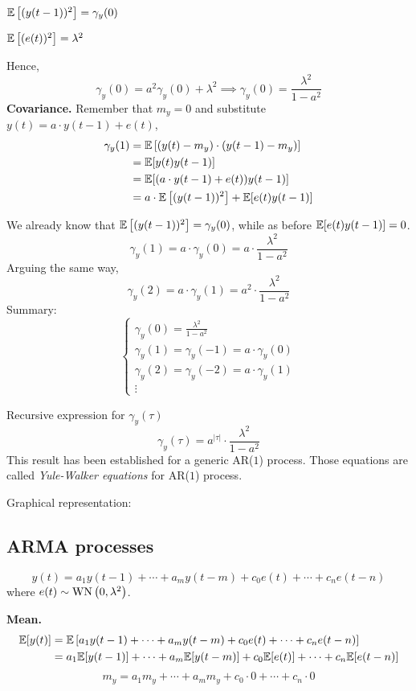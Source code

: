 $\mathbb{E}\left[(y(t-1))^{2}\right]=\gamma_{y}(0)$

$\mathbb{E}\left[(e(t))^{2}\right]=\lambda^{2}$

Hence,
\[
	\gamma_{y}(0)=a^{2} \gamma_{y}(0)+\lambda^{2} \implies \gamma_{y}(0)=\frac{\lambda^{2}}{1-a^{2}}
\]
\textbf{Covariance.}
Remember that $m_{y}=0$ and substitute $y(t)=a \cdot y(t-1)+e(t)$,
\begin{align*}
	\gamma_{y}(1)&=\mathbb{E}\left[\left(y(t)-m_{y}\right) \cdot\left(y(t-1)-m_{y}\right)\right]\\
	&=\mathbb{E}[y(t) y(t-1)]\\
	&=\mathbb{E}[(a \cdot y(t-1)+e(t))y(t-1)]\\
	&=a \cdot \mathbb{E}\left[(y(t-1))^{2}\right]+\mathbb{E}[e(t) y(t-1)]
\end{align*}

We already know that $\mathbb{E}\left[(y(t-1))^{2}\right]=\gamma_{y}(0)$, while as before $\mathbb{E}[e(t) y(t-1)]=0$.
$$
\gamma_{y}(1)=a \cdot \gamma_{y}(0)=a \cdot \frac{\lambda^{2}}{1-a^{2}}
$$
Arguing the same way,
\[
	\gamma_{y}(2)=a \cdot \gamma_{y}(1)=a^{2} \cdot \frac{\lambda^{2}}{1-a^{2}}
\]
Summary:
\begin{equation*}
	\boxed{
		\begin{cases}
			\gamma_{y}(0)=\frac{\lambda^{2}}{1-a^{2}} \\
			\gamma_{y}(1)=\gamma_{y}(-1)=a \cdot \gamma_{y}(0) \\
			\gamma_{y}(2)=\gamma_{y}(-2)=a \cdot \gamma_{y}(1) \\
			\vdots
		\end{cases}
	}
\end{equation*}

Recursive expression for $\gamma_{y}(\tau)$
$$
	\gamma_{y}(\tau)=a^{|\tau|}\cdot \frac{\lambda^{2}}{1-a^{2}}
$$
This result has been established for a generic AR($1$) process.
Those equations are called \emph{Yule-Walker equations} for AR($1$) process.

Graphical representation:



\subsection{ARMA processes}
$$
y(t)=a_{1} y(t-1)+\cdots+a_{m} y(t-m)+c_{0} e(t)+\cdots+c_{n} e(t-n)
$$
where $e(t) \sim \operatorname{WN}\left(0, \lambda^{2}\right)$.

\textbf{Mean.}
\begin{align*}
	\mathbb{E}[y(t)] &=\mathbb{E}\left[a_{1} y(t-1)+\cdots+a_{m} y(t-m)+c_{0} e(t)+\cdots+c_{n} e(t-n)\right] \\
	&=a_{1} \mathbb{E}[y(t-1)]+\cdots+a_{m} \mathbb{E}[y(t-m)]+c_{0} \mathbb{E}[e(t)]+\cdots+c_{n} \mathbb{E}[e(t-n)]
\end{align*}
$$
m_{y}=a_{1} m_{y}+\cdots+a_{m} m_{y}+c_{0} \cdot 0+\cdots+c_{n} \cdot 0
$$

